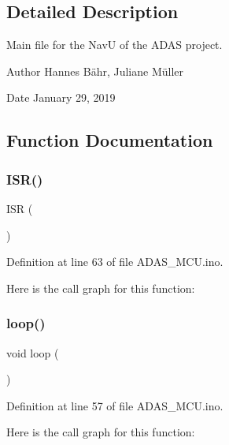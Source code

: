 \subsection{Detailed Description}
Main file for the NavU of the A\+D\+AS project. 

\begin{DoxyAuthor}{Author}
Hannes Bähr, Juliane Müller 
\end{DoxyAuthor}
\begin{DoxyDate}{Date}
January 29, 2019 
\end{DoxyDate}


\subsection{Function Documentation}
\mbox{\label{_a_d_a_s___m_c_u_8ino_a63a86aad9ba2e355fe6380da553f554e}} 
\subsubsection{\texorpdfstring{ISR()}{ISR()}}
{\footnotesize\ttfamily I\+SR (\begin{DoxyParamCaption}\item[{U\+S\+A\+R\+T2\+\_\+\+R\+X\+\_\+vect}]{ }\end{DoxyParamCaption})}



Definition at line 63 of file A\+D\+A\+S\+\_\+\+M\+C\+U.\+ino.

Here is the call graph for this function\+:
\mbox{\label{_a_d_a_s___m_c_u_8ino_afe461d27b9c48d5921c00d521181f12f}} 
\subsubsection{\texorpdfstring{loop()}{loop()}}
{\footnotesize\ttfamily void loop (\begin{DoxyParamCaption}{ }\end{DoxyParamCaption})}



Definition at line 57 of file A\+D\+A\+S\+\_\+\+M\+C\+U.\+ino.

Here is the call graph for this function\+:
\mbox{\label{_a_d_a_s___m_c_u_8ino_a4fc01d736fe50cf5b977f755b675f11d}} 
